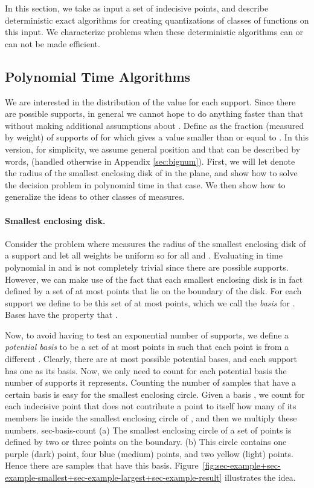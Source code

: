 \documentclass{journal}
\newcommand{\pset}{support\xspace}
\newcommand{\psets}{supports\xspace}
\begin{document}
In this section, we take as input a set of  indecisive points, and describe deterministic exact algorithms for creating quantizations of classes of functions on this input.  We characterize problems when these deterministic algorithms can or can not be made efficient.  

\subsection {Polynomial Time Algorithms}
\label {sec:pta}

We are interested in the distribution of the value  for each \pset .  Since there are  possible \psets, in general we cannot hope to do anything faster than that without making additional assumptions about .
Define  as the fraction (measured by weight) of \psets of  for which  gives a value smaller than or equal to .
In this version, for simplicity, we assume general position and that  can be described by  words, (handled otherwise in Appendix \ref{sec:bignum}).  
First, we will let  denote the radius of the smallest enclosing disk of  in the plane, and show how to solve the decision problem in polynomial time in that case. We then show how to generalize the ideas to other classes of measures.

\paragraph{Smallest enclosing disk.}
Consider the problem where  measures the radius of the smallest enclosing disk of a \pset and let all weights be uniform so  for all  and .  
Evaluating  in time polynomial in  and  is not completely trivial since there are  possible \psets.  However, we can make use of the fact that each smallest enclosing disk is in fact defined by a set of at most  points that lie on the boundary of the disk. 
For each \pset  we define  to be this set of at most  points, which we call the \emph {basis} for .
Bases have the property that .

Now, to avoid having to test an exponential number of \psets, we define a \emph{potential basis} to be a set of at most  points in  such that each point is from a different . Clearly, there are at most  possible potential bases, and each \pset  has one as its basis.
Now, we only need to count for each potential basis the number of \psets it represents.
Counting the number of samples that have a certain basis is easy for the smallest enclosing circle. Given a basis , we count for each indecisive point  that does not contribute a point to  itself how many of its members lie inside the smallest enclosing circle of , and then we multiply these numbers.
 {sec-basis-count} {(a) The smallest enclosing circle of a set of points is defined by two or three points on the boundary. (b) This circle contains one purple (dark) point, four blue (medium) points, and two yellow (light) points. Hence there are  samples that have this basis.}
Figure~\ref {fig:sec-example+sec-example-smallest+sec-example-largest+sec-example-result} illustrates the idea.
\end{document}
